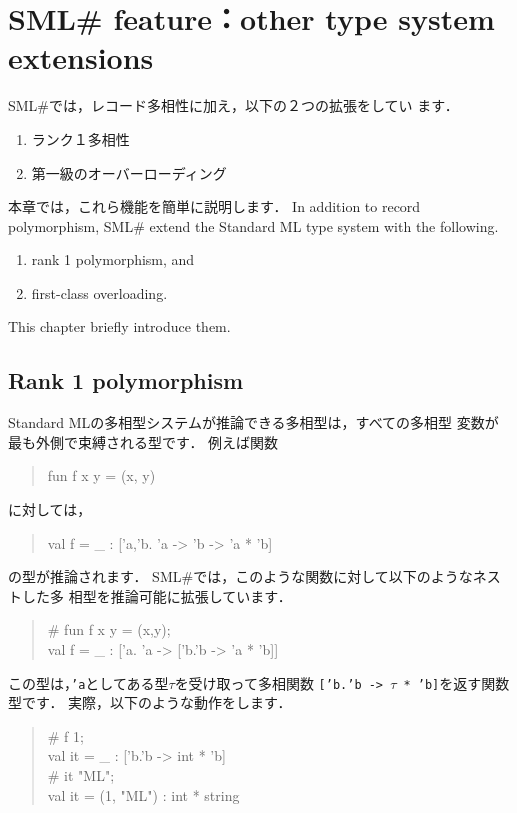 \documentclass{jbook}
\newcommand{\txt}[2]{#2}
\newcommand{\smlsharp}{SML\#}
\newenvironment{program}{\begin{quote}\begin{tt}}%
                        {\end{tt}\end{quote}}
\begin{document}
\chapter{\txt{\smlsharp{}の拡張機能：その他の型の拡張}{\smlsharp{} feature：other type system extensions}}
\label{chap:tutorialOthertyping}

\ifjp%
	\smlsharp{}では，レコード多相性に加え，以下の２つの拡張をしてい
ます．
\begin{enumerate}
\item ランク１多相性
\item 第一級のオーバーローディング
\end{enumerate}
	本章では，これら機能を簡単に説明します．
\else%
	In addition to record polymorphism, \smlsharp{} extend the Standard
ML type system  with the following.
\begin{enumerate}
\item rank 1 polymorphism, and
\item first-class overloading.
\end{enumerate}
	This chapter briefly introduce them.
\fi%

\section{\txt{ランク１多相性}{Rank 1 polymorphism}}
\label{sec:extensionRank1}

\ifjp%
	Standard MLの多相型システムが推論できる多相型は，すべての多相型
変数が最も外側で束縛される型です．
	例えば関数
\begin{program}
fun f x y = (x, y)
\end{program}
に対しては，
\begin{program}
val f = \_ : ['a,'b. 'a -> 'b -> 'a * 'b]
\end{program}
の型が推論されます．
	\smlsharp{}では，このような関数に対して以下のようなネストした多
相型を推論可能に拡張しています．
\begin{program}
\# fun f x y = (x,y);\\
val f = \_ : ['a. 'a -> ['b.'b -> 'a * 'b]]
\end{program}
	この型は，{\tt 'a}としてある型$\tau$を受け取って多相関数
{\tt ['b.'b -> $\tau$ * 'b]}を返す関数型です．
	実際，以下のような動作をします．
\begin{program}
\# f 1;\\
val it = \_ : ['b.'b -> int * 'b]\\
\# it "ML";\\
val it = (1, "ML") : int * string
\end{program}
\end{document}

